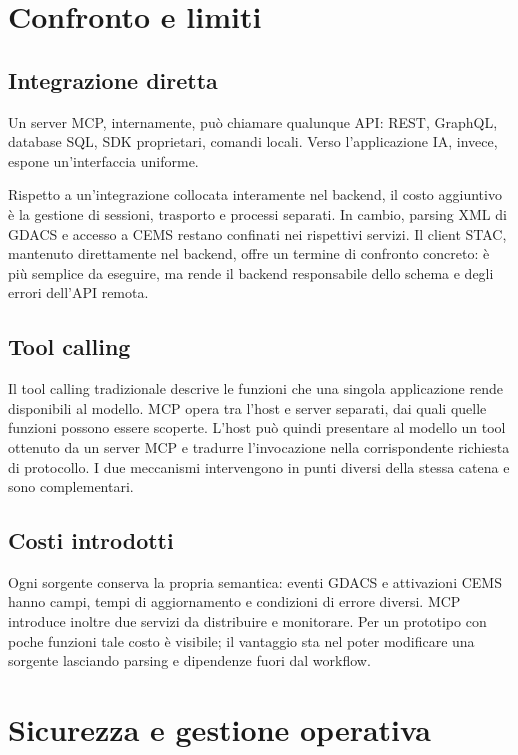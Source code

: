 \section{Confronto e limiti}

\subsection{Integrazione diretta}

Un server MCP, internamente, può chiamare qualunque API: REST, GraphQL, database SQL, SDK proprietari, comandi locali. Verso l'applicazione IA, invece, espone un'interfaccia uniforme.

Rispetto a un'integrazione collocata interamente nel backend, il costo aggiuntivo
è la gestione di sessioni, trasporto e processi separati. In cambio, parsing XML
di GDACS e accesso a CEMS restano confinati nei rispettivi servizi. Il client
STAC, mantenuto direttamente nel backend, offre un termine di confronto concreto:
è più semplice da eseguire, ma rende il backend responsabile dello schema e degli
errori dell'API remota.

\subsection{Tool calling}

Il tool calling tradizionale descrive le funzioni che una singola applicazione
rende disponibili al modello. MCP opera tra l'host e server separati, dai quali
quelle funzioni possono essere scoperte. L'host può quindi presentare al modello
un tool ottenuto da un server MCP e tradurre l'invocazione nella corrispondente
richiesta di protocollo. I due meccanismi intervengono in punti diversi della
stessa catena e sono complementari.

\subsection{Costi introdotti}

Ogni sorgente conserva la propria semantica: eventi GDACS e attivazioni CEMS
hanno campi, tempi di aggiornamento e condizioni di errore diversi. MCP
introduce inoltre due servizi da distribuire e monitorare. Per un prototipo con
poche funzioni tale costo è visibile; il vantaggio sta nel poter modificare una
sorgente lasciando parsing e dipendenze fuori dal workflow.

\section{Sicurezza e gestione operativa}

